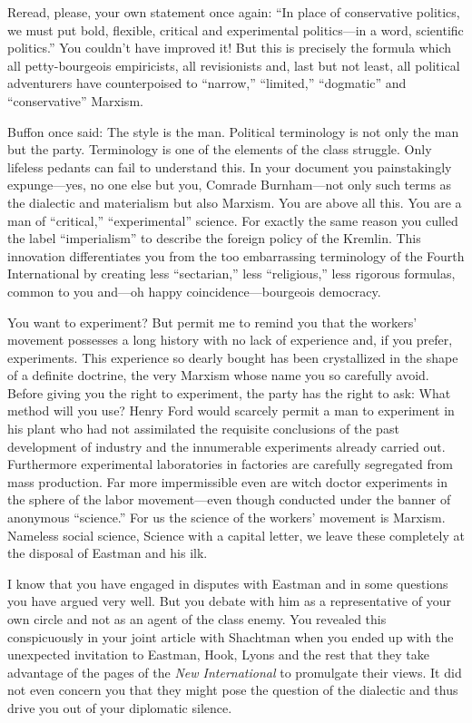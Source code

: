 Reread, please, your own statement once again: “In place of conservative politics, we must put bold, flexible, critical and experimental politics---in a word, scientific politics.” You couldn’t have improved it! But this is precisely the formula which all petty-bourgeois empiricists, all revisionists and, last but not least, all political adventurers have counterpoised to “narrow,” “limited,” “dogmatic” and “conservative” Marxism.

Buffon once said: The style is the man. Political terminology is not only the man but the party. Terminology is one of the elements of the class struggle. Only lifeless pedants can fail to understand this. In your document you painstakingly expunge---yes, no one else but you, Comrade Burnham---not only such terms as the dialectic and materialism but also Marxism. You are above all this. You are a man of “critical,” “experimental” science. For exactly the same reason you culled the label “imperialism” to describe the foreign policy of the Kremlin. This innovation differentiates you from the too embarrassing terminology of the Fourth International by creating less “sectarian,” less “religious,” less rigorous formulas, common to you and---oh happy coincidence---bourgeois democracy.

You want to experiment? But permit me to remind you that the workers’ movement possesses a long history with no lack of experience and, if you prefer, experiments. This experience so dearly bought has been crystallized in the shape of a definite doctrine, the very Marxism whose name you so carefully avoid. Before giving you the right to experiment, the party has the right to ask: What method will you use? Henry Ford would scarcely permit a man to experiment in his plant who had not assimilated the requisite conclusions of the past development of industry and the innumerable experiments already carried out. Furthermore experimental laboratories in factories are carefully segregated from mass production. Far more impermissible even are witch doctor experiments in the sphere of the labor movement---even though conducted under the banner of anonymous “science.” For us the science of the workers’ movement is Marxism. Nameless social science, Science with a capital letter, we leave these completely at the disposal of Eastman and his ilk.

I know that you have engaged in disputes with Eastman and in some questions you have argued very well. But you debate with him as a representative of your own circle and not as an agent of the class enemy. You revealed this conspicuously in your joint article with Shachtman when you ended up with the unexpected invitation to Eastman, Hook, Lyons and the rest that they take advantage of the pages of the \emph{New International} to promulgate their views. It did not even concern you that they might pose the question of the dialectic and thus drive you out of your diplomatic silence.

